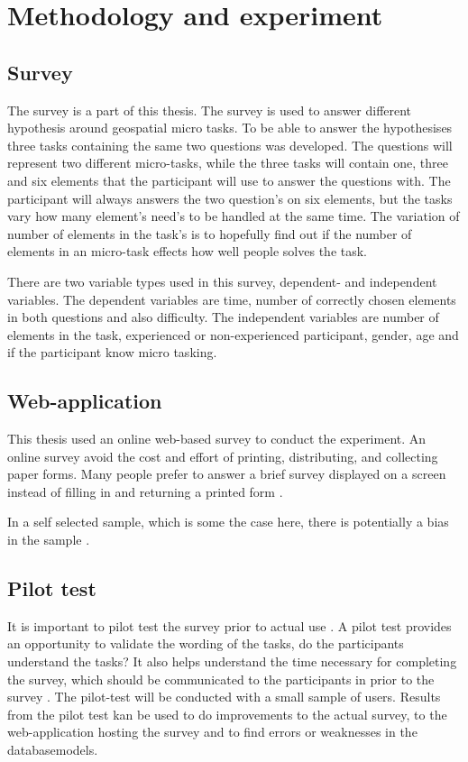 \chapter{Methodology and experiment}

\section{Survey}
The survey is a part of this thesis. The survey is used to answer different hypothesis around geospatial micro tasks. To be able to answer the hypothesises three tasks containing the same two questions was developed. The questions will represent two different micro-tasks, while the three tasks will contain one, three and six elements that the participant will use to answer the questions with. The participant will always answers the two question's on six elements, but the tasks vary how many element's need's to be handled at the same time. The variation of number of elements in the task's is to hopefully find out if the number of elements in an micro-task effects how well people solves the task. 

There are two variable types used in this survey, dependent- and independent variables. The dependent variables are time, number of correctly chosen elements in both questions and also difficulty. The independent variables are number of elements in the task, experienced or non-experienced participant, gender, age and if the participant know micro tasking.

\section{Web-application}
This thesis used an online web-based survey to conduct the experiment. An online survey avoid the cost and effort of printing, distributing, and collecting paper forms. Many people prefer to answer a brief survey displayed on a screen instead of filling in and returning a printed form \citep{Ben2009}.   

In a self selected sample, which is some the case here, there is potentially a bias in the sample \citep{Ben2009}. %

\section{Pilot test}
It is important to pilot test the survey prior to actual use \citep{Ben2009}. A pilot test provides an opportunity to validate the wording of the tasks, do the participants understand the tasks? It also helps understand the time necessary for completing the survey, which should be communicated to the participants in prior to the survey \citep{Schade2015}. The pilot-test will be conducted with a small sample of users. Results from the pilot test kan be used to do improvements to the actual survey, to the web-application hosting the survey and to find errors or weaknesses in the databasemodels.

